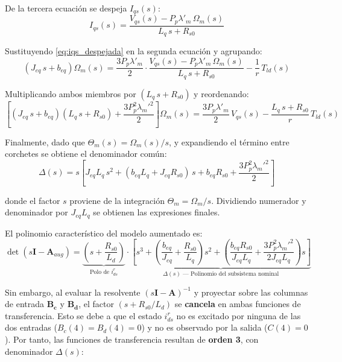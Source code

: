 \documentclass[12pt, a4paper,journal, onecolumn, compsoc]{IEEEtran}
\begin{document}
De la tercera ecuación se despeja $I_{qs}(s)$:
\begin{equation}\label{eq:iqs_despejada}
    I_{qs}(s) = \frac{V_{qs}(s) - P_p \lambda'_m\,\Omega_m(s)}{L_q\,s + R_{s0}}
\end{equation}

Sustituyendo \eqref{eq:iqs_despejada} en la segunda ecuación y agrupando:
\begin{equation}
    \left(J_{eq}\,s + b_{eq}\right)\Omega_m(s) = \frac{3 P_p \lambda'_m}{2} \cdot \frac{V_{qs}(s) - P_p \lambda'_m\,\Omega_m(s)}{L_q\,s + R_{s0}} - \frac{1}{r}\,T_{ld}(s)
\end{equation}

Multiplicando ambos miembros por $(L_q\,s + R_{s0})$ y reordenando:
\begin{equation}
    \left[(J_{eq}\,s + b_{eq})(L_q\,s + R_{s0}) + \frac{3 P_p^2 \lambda_m'^2}{2}\right]\Omega_m(s) = \frac{3 P_p \lambda'_m}{2}\,V_{qs}(s) - \frac{L_q\,s + R_{s0}}{r}\,T_{ld}(s)
\end{equation}

Finalmente, dado que $\Theta_m(s) = \Omega_m(s)/s$, y expandiendo el término entre corchetes se obtiene el denominador común:
\begin{equation}
    \Delta(s) = s\left[J_{eq} L_q\,s^2 + (b_{eq} L_q + J_{eq} R_{s0})\,s + b_{eq} R_{s0} + \frac{3 P_p^2 \lambda_m'^2}{2}\right]
\end{equation}

donde el factor $s$ proviene de la integración $\Theta_m = \Omega_m / s$. Dividiendo numerador y denominador por $J_{eq} L_q$ se obtienen las expresiones finales.

\vspace{0.3cm}

El polinomio característico del modelo aumentado es:
\begin{equation}
    \det(s\mathbf{I} - \mathbf{A}_{aug}) = \underbrace{\left(s + \frac{R_{s0}}{L_d}\right)}_{\text{Polo de } i_{ds}^r} \cdot \underbrace{\left[ s^3 + \left(\frac{b_{eq}}{J_{eq}} + \frac{R_{s0}}{L_q}\right)s^2 + \left(\frac{b_{eq} R_{s0}}{J_{eq} L_q} + \frac{3 P_p^2 \lambda_m'^2}{2 J_{eq} L_q}\right)s \right]}_{\Delta(s) \text{ --- Polinomio del subsistema nominal}}
\end{equation}

Sin embargo, al evaluar la resolvente $(s\mathbf{I}-\mathbf{A})^{-1}$ y proyectar sobre las columnas de entrada $\mathbf{B_c}$ y $\mathbf{B_d}$, el factor $(s + R_{s0}/L_d)$ se \textbf{cancela} en ambas funciones de transferencia. Esto se debe a que el estado $i_{ds}^r$ no es excitado por ninguna de las dos entradas ($B_c(4) = B_d(4) = 0$) y no es observado por la salida ($C(4) = 0$). Por tanto, las funciones de transferencia resultan de \textbf{orden 3}, con denominador $\Delta(s)$:
\end{document}

